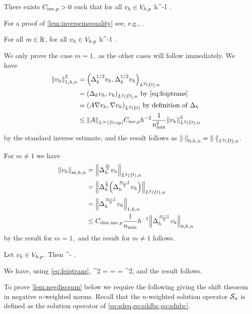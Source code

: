\label{lem:inverseinequality}
There exists $C_{\mathrm{inv},p} > 0$ such that for all $v_{h} \in V_{h,p}$
\beqs
\NHoD{\vh} \leq \CinvVhp h^{-1} \NLtD{\vh}.
\eeqs
\ele

For a proof of \cref{lem:inverseinequality} see, e.g., \cite[Theorem 4.5.11 and Remark 4.5.20]{BrSc:08}.

\label{lem:inversediscrete}
For all $m \in \mathbb R$, for all $v_{h} \in V_{h,p}$
\beqs
\Nmhn{\vh} \leq \Chinv {} h^{-1} \Nmmohn{\vh}.
\eeqs
\ele

We only prove the case $m=1,$ as the other cases will follow immediately. We have
\begin{align*}
\Nfn{1,h,n}{\vh}^2 &= \IPLtDn{\Deltahh \vh}{\Deltahh \vh}\\
&= \IPLtDn{\Deltah \vh}{\vh} \text{ by \cref{eq:feiptrans}}\\
&= \IPLtD{A \grad \vh}{\grad \vh} \text{ by definition of } \Deltah\\
&\leq \NLiDop{A} \CinvVhp h^{-2}\frac{1}{\nmin^2} \NLtDn{\vh}^2
\end{align*}
by the standard inverse estimate, and the result follows as $\Nzhn{\cdot} = \NLtDn{\cdot}$.

For $m \neq 1$ we have
\begin{align*}
  \Nmhn{\vh} &= \NLtDn{\Deltah^{\frac{m}2}\vh}\\
  &= \NLtDn{\Deltah^{\half}\mleft(\Deltah^{\frac{m-1}2}\vh\mright)}\\
  &= \Nohn{\Deltah^{\frac{m-1}2}\vh}\\
  &\leq \Chinv \frac{1}{\nmin} h^{-1} \Nzhn{\Deltah^{\frac{m-1}2}\vh}\\
\end{align*}
by the result for $m=1,$ and the result for $m\neq 1$ follows.
\epf


\label{lem:h1contdisc}
Let $v_{h} \in V_{h,p}$. Then
\beqs
\SNHoD{\vh} \leq \Amin^{-\half} \Nohn{\vh}.
\eeqs
\ele

We have, using \cref{eq:feiptrans},
\beqs
\Nohn{\vh}^2 = \IPLtDn{\Deltahh \vh}{\Deltahh \vh} = \IPLtDn{\Deltah \vh}{\vh}=  \geq \Amin \NLtD{\grad \vh}^2,
\eeqs
and the result follows.
\epf

To prove \cref{lem:negdiscsum} below we require the following  giving the shift theorem in negative $n$-weighted norms. Recall that the $n$-weighted solution operator $\mathcal S_{n}$ is defined as the solution operator of \cref{eq:sdeq,eq:sddbc,eq:sdnbc}.

